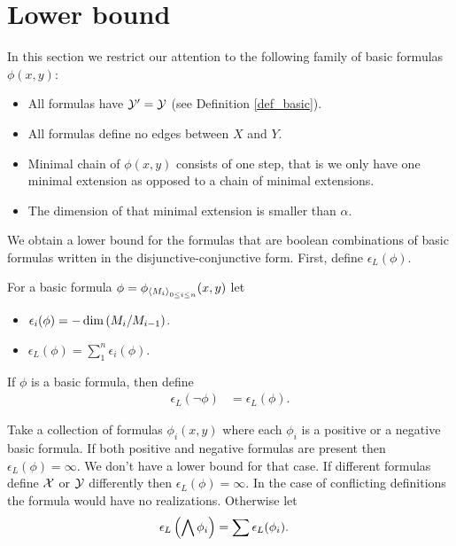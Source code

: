 \section{Lower bound}

In this section we restrict our attention to the following family of basic formulas $\phi(x,y)$:
\begin{itemize}
\item All formulas have $\mathcal Y' = \mathcal Y$ (see Definition \ref{def_basic}).
\item All formulas define no edges between $X$ and $Y$.
\item Minimal chain of $\phi(x,y)$ consists of one step, that is we only have one minimal extension as opposed to a chain of minimal extensions.
\item The dimension of that minimal extension is smaller than $\alpha$.
\end{itemize}

We obtain a lower bound for the formulas that are boolean combinations of basic formulas written in the disjunctive-conjunctive form.
First, define $\epsilon_L(\phi)$.

\begin{Definition} 
  For a basic formula $\phi = \phi_{\left\langle M_i \right\rangle_{0 \leq i \leq n}}(x, y)$ let
  \begin{itemize}
  \item $\epsilon_i(\phi) = -\dim \left(M_i/M_{i-1}\right)$.
  \item $\epsilon_L(\phi) = \sum_1^{n} \epsilon_i(\phi)$.
  \end{itemize}
\end{Definition}

\begin{Definition}[Negation]
  If $\phi$ is a basic formula, then define
  \begin{align*}
    \epsilon_L(\neg \phi) &= \epsilon_L(\phi).
  \end{align*}
\end{Definition}

\begin{Definition}[Conjunction]
  Take a collection of formulas $\phi_i(x, y)$ where each $\phi_i$ is a positive or a negative basic formula.
  If both positive and negative formulas are present then $\epsilon_L(\phi) = \infty$.
  We don't have a lower bound for that case.
  If different formulas define $\mathcal X$ or $\mathcal Y$ differently then $\epsilon_L(\phi) = \infty$.
  In the case of conflicting definitions the formula would have no realizations.
  Otherwise let
  \begin{align*}
    \epsilon_L\left(\bigwedge \phi_i\right) &= \sum \epsilon_L(\phi_i).
  \end{align*}
\end{Definition}

